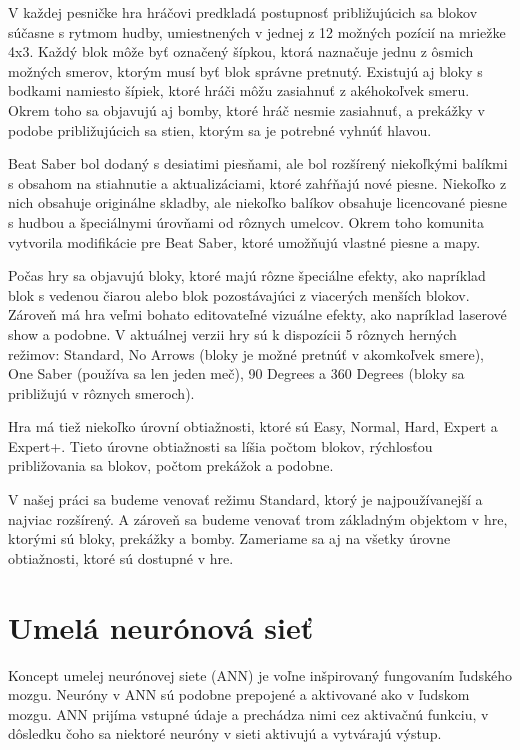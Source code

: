 V každej pesničke hra hráčovi predkladá postupnosť približujúcich sa blokov súčasne s rytmom hudby, umiestnených v jednej z 12 možných pozícií na mriežke 4x3. Každý blok môže byť označený šípkou, ktorá naznačuje jednu z ôsmich možných smerov, ktorým musí byť blok správne pretnutý. Existujú aj bloky s bodkami namiesto šípiek, ktoré hráči môžu zasiahnuť z akéhokoľvek smeru. Okrem toho sa objavujú aj bomby, ktoré hráč nesmie zasiahnuť, a prekážky v podobe približujúcich sa stien, ktorým sa je potrebné vyhnúť hlavou.

Beat Saber bol dodaný s desiatimi piesňami, ale bol rozšírený niekoľkými balíkmi s obsahom na stiahnutie a aktualizáciami, ktoré zahŕňajú nové piesne. Niekoľko z nich obsahuje originálne skladby, ale niekoľko balíkov obsahuje licencované piesne s hudbou a špeciálnymi úrovňami od rôznych umelcov. Okrem toho komunita vytvorila modifikácie pre Beat Saber, ktoré umožňujú vlastné piesne a mapy.

Počas hry sa objavujú bloky, ktoré majú rôzne špeciálne efekty, ako napríklad blok s vedenou čiarou alebo blok pozostávajúci z viacerých menších blokov. Zároveň má hra veľmi bohato editovateľné vizuálne efekty, ako napríklad laserové show a podobne. V aktuálnej verzii hry sú k dispozícii 5 rôznych herných režimov: Standard, No Arrows (bloky je možné pretnúť v akomkoľvek smere), One Saber (používa sa len jeden meč), 90 Degrees a 360 Degrees (bloky sa približujú v rôznych smeroch).

Hra má tiež niekoľko úrovní obtiažnosti, ktoré sú Easy, Normal, Hard, Expert a Expert+. Tieto úrovne obtiažnosti sa líšia počtom blokov, rýchlosťou približovania sa blokov, počtom prekážok a podobne.

V našej práci sa budeme venovať režimu Standard, ktorý je najpoužívanejší a najviac rozšírený. A zároveň sa budeme venovať trom základným objektom v hre, ktorými sú bloky, prekážky a bomby. Zameriame sa aj na všetky úrovne obtiažnosti, ktoré sú dostupné v hre.

\section{Umelá neurónová sieť}\label{sec:neuronove_siete}

Koncept umelej neurónovej siete (ANN) je voľne inšpirovaný fungovaním ľudského mozgu. Neuróny v ANN sú podobne prepojené a aktivované ako v ľudskom mozgu. ANN prijíma vstupné údaje a prechádza nimi cez aktivačnú funkciu, v dôsledku čoho sa niektoré neuróny v sieti aktivujú a vytvárajú výstup.

